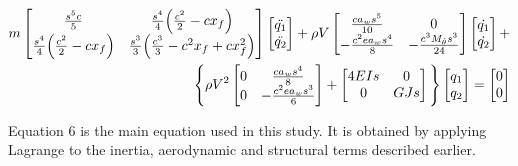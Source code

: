 \documentclass[11pt]{article}
\begin{document}

\begin{equation}\label{eq:full-aeroe}
\begin{gathered}
\begin{split}
    m\begin{bmatrix} \frac{s^5c}{5} & \frac{s^4}{4}\Big{(}\frac{c^2}{2}-cx_f\Big{)} \\ \frac{s^4}{4}\Big{(}\frac{c^2}{2}-cx_f\Big{)} & \frac{s^3}{3}\Big{(}\frac{c^3}{3}-c^2x_f+cx_f^2\Big{)} \end{bmatrix} \begin{bmatrix}\ddot{q_1}\\ \ddot{q_2} \end{bmatrix} + \rho V \begin{bmatrix} \frac{ca_w s^5}{10} & 0 \\ -\frac{c^2e a_w s^4}{8} & -\frac{c^3M_{\dot\theta}s^3}{24} \end{bmatrix}\begin{bmatrix}\dot{q_1}\\ \dot{q_2}\end{bmatrix} +\\ \Bigg{\{}\rho V^2  \begin{bmatrix} 0 & \frac{ca_ws^4}{8} \\ 0 & -\frac{c^2ea_ws^3}{6} \end{bmatrix} + \begin{bmatrix} 4EIs & 0 \\ 0 & GJs \end{bmatrix} \Bigg{\}}\begin{bmatrix} q_1 \\ q_2 \end{bmatrix} = \begin{bmatrix} 0 \\ 0 \end{bmatrix}
\end{split}
\end{gathered}
\end{equation}

Equation 6 is the main equation used in this study. It is obtained by applying Lagrange to the inertia, aerodynamic and structural terms described earlier.

\end{document}
